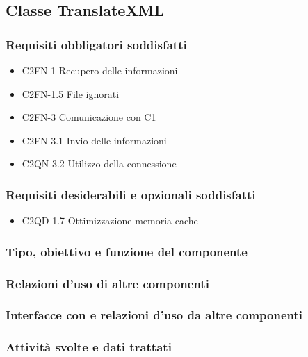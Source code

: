 \subsection{Classe TranslateXML}
\subsubsection*{Requisiti obbligatori soddisfatti}
\begin{itemize}
   \item C2FN-1 Recupero delle informazioni
   \item C2FN-1.5 File ignorati
   \item C2FN-3 Comunicazione con C1
   \item C2FN-3.1 Invio delle informazioni
   \item C2QN-3.2 Utilizzo della connessione
\end{itemize}
\subsubsection*{Requisiti desiderabili e opzionali soddisfatti}
\begin{itemize}
   \item C2QD-1.7 Ottimizzazione memoria cache
\end{itemize}
\subsubsection*{Tipo, obiettivo e funzione del componente}
\subsubsection*{Relazioni d'uso di altre componenti}
\subsubsection*{Interfacce con e relazioni d'uso da altre componenti}
\subsubsection*{Attivit\`a svolte e dati trattati}




